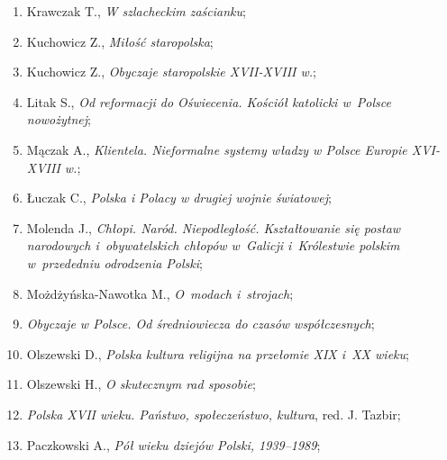 \documentclass[a4paper,11pt]{article}
\begin{document}
\begin{enumerate}
\item Krawczak T., \textit{W szlacheckim zaścianku};



\item Kuchowicz Z., \textit{Miłość staropolska};



\item Kuchowicz Z., \textit{Obyczaje staropolskie XVII-XVIII w.};



\item Litak S., \textit{Od reformacji do Oświecenia. Kościół katolicki
    w~Polsce nowożytnej};



\item Mączak A., \textit{Klientela. Nieformalne systemy władzy w Polsce
    Europie XVI-XVIII w.};



\item Łuczak C., \textit{Polska i Polacy w drugiej wojnie światowej};



\item Molenda J., \textit{Chłopi. Naród. Niepodległość. Kształtowanie
    się postaw narodowych i~obywatelskich chłopów w~Galicji
    i~Królestwie polskim w~przededniu odrodzenia Polski};



\item Możdżyńska-Nawotka M., \textit{O~modach i~strojach};



\item \textit{Obyczaje w Polsce. Od średniowiecza do czasów
    współczesnych};



\item Olszewski D., \textit{Polska kultura religijna na przełomie XIX
    i~XX wieku};



\item Olszewski H., \textit{O skutecznym rad sposobie};



\item \textit{Polska XVII wieku. Państwo, społeczeństwo, kultura}, red.
  J. Tazbir;



\item Paczkowski A., \textit{Pół wieku dziejów Polski, 1939--1989};




\end{enumerate}
\end{document}
